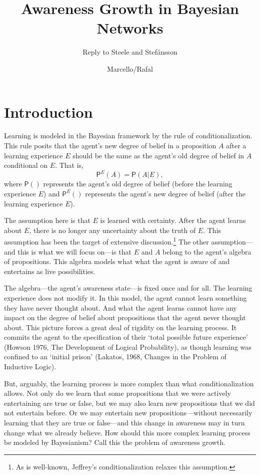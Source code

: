\documentclass[
  11pt,
  dvipsnames,enabledeprecatedfontcommands]{scrartcl}
\title{Awareness Growth in Bayesian Networks}
\subtitle{Reply to Steele and Stefánsson}
\author{Marcello/Rafal}
\date{}
\newcommand{\pr}[1]{\ensuremath{\mathsf{P}(#1)}}
\newcommand{\ppr}[2]{\ensuremath{\mathsf{P}^{#1}(#2)}}
\begin{document}
\maketitle

\hypertarget{introduction}{%
\section{Introduction}\label{introduction}}

Learning is modeled in the Bayesian framework by the rule of
conditionalization. This rule posits that the agent's new degree of
belief in a proposition \(A\) after a learning experience \(E\) should
be the same as the agent's old degree of belief in \(A\) conditional on
\(E\). That is, \[\ppr{E}{A}=\pr{A \vert E},\] where \(\pr{}\)
represents the agent's old degree of belief (before the learning
experience \(E\)) and \(\ppr{E}{}\) represents the agent's new degree of
belief (after the learning experience \(E\)).

The assumption here is that \(E\) is learned with certainty. After the
agent learns about \(E\), there is no longer any uncertainty about the
truth of \(E\). This assumption has been the target of extensive
discussion.\footnote{As is well-known, Jeffrey's conditionalization
  relaxes this assumption.} The other assumption---and this is what we
will focus on---is that \(E\) and \(A\) belong to the agent's algebra of
propositions. This algebra models what what the agent is aware of and
entertains as live possibilities.

The algebra---the agent's awareness state---is fixed once and for all.
The learning experience does not modify it. In this model, the agent
cannot learn something they have never thought about. And what the agent
learns cannot have any impact on the degree of belief about propositions
that the agent never thought about. This picture forces a great deal of
rigidity on the learning process. It commits the agent to the
specification of their `total possible future experience' (Howson 1976,
The Development of Logical Probability), as though learning was confined
to an `initial prison' (Lakatos, 1968, Changes in the Problem of
Inductive Logic).

But, arguably, the learning process is more complex than what
conditionalization allows. Not only do we learn that some propositions
that we were actively entertaining are true or false, but we may also
learn new propositions that we did not entertain before. Or we may
entertain new propositions---without necessarily learning that they are
true or false---and this change in awareness may in turn change what we
already believe. How should this more complex learning process be
modeled by Bayesianism? Call this the problem of awareness growth.
\end{document}
